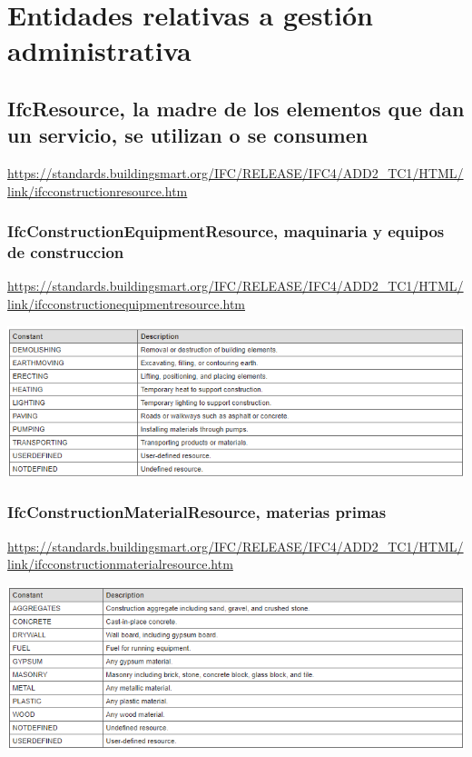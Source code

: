 \documentclass[spanish,12pt,a4paper,final,oneside]{book}
\begin{document}
\chapter{Entidades relativas a gestión administrativa}



\section{IfcResource, la madre de los elementos que dan un servicio, se utilizan o se consumen}
\url{https://standards.buildingsmart.org/IFC/RELEASE/IFC4/ADD2_TC1/HTML/link/ifcconstructionresource.htm}

\subsection{IfcConstructionEquipmentResource, maquinaria y equipos de construccion}
\url{https://standards.buildingsmart.org/IFC/RELEASE/IFC4/ADD2_TC1/HTML/link/ifcconstructionequipmentresource.htm}

\includegraphics[width=\textwidth]{Definicion de IfcConstructionEquipmentResourceEnum}

\subsection{IfcConstructionMaterialResource, materias primas}
\url{https://standards.buildingsmart.org/IFC/RELEASE/IFC4/ADD2_TC1/HTML/link/ifcconstructionmaterialresource.htm}

\includegraphics[width=\textwidth]{Definicion de IfcConstructionMaterialResourceEnum}
\end{document}
